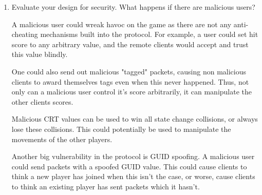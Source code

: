 \documentclass{article}
\begin{document}
\begin{enumerate}
\item Evaluate your design for security. What happens if there are
malicious users?

A malicious user could wreak havoc on the game as there are not any
anti-cheating mechanisms built into the protocol. For example, a user
could set hit score to any arbitrary value, and the remote clients would
accept and trust this value blindly.

One could also send out malicious "tagged" packets, causing non
malicious clients to award themselves tags even when this never
happened. Thus, not only can a malicious user control it's score
arbitrarily, it can manipulate the other clients scores.

Malicious CRT values can be used to win all state change collisions, or
always lose these collisions. This could potentially be used to
manipulate the movements of the other players.

Another big vulnerability in the protocol is GUID spoofing. A malicious
user could send packets with a spoofed GUID value. This could cause
clients to think a new player has joined when this isn't the case, or
worse, cause clients to think an existing player has sent packets which
it hasn't.

\end{enumerate}
\end{document}
